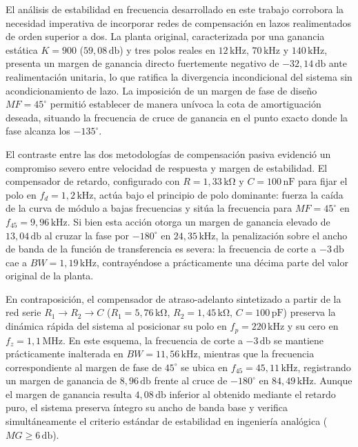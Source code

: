 El análisis de estabilidad en frecuencia desarrollado en este trabajo corrobora la necesidad imperativa de incorporar
redes de compensación en lazos realimentados de orden superior a dos. La planta original, caracterizada
por una ganancia estática $K = 900$ ($59,08\,\si{\decibel}$) y tres polos reales en $12\,\si{\kilo\hertz}$, $70\,\si{\kilo\hertz}$ y
$140\,\si{\kilo\hertz}$, presenta un margen de ganancia directo fuertemente negativo de $-32,14\,\si{\decibel}$ ante realimentación
unitaria, lo que ratifica la divergencia incondicional del sistema sin acondicionamiento de lazo. La imposición de un margen
de fase de diseño $MF = 45^\circ$ permitió establecer de manera unívoca la cota de amortiguación deseada, situando la
frecuencia de cruce de ganancia en el punto exacto donde la fase alcanza los $-135^\circ$.

El contraste entre las dos metodologías de compensación pasiva evidenció un compromiso severo entre velocidad de respuesta y
margen de estabilidad. El compensador de retardo, configurado con $R = 1,33\,\si{\kilo\ohm}$ y $C = 100\,\si{\nano\farad}$ para fijar
el polo en $f_d = 1,2\,\si{\kilo\hertz}$, actúa bajo el principio de polo dominante: fuerza la caída de la curva de módulo a bajas
frecuencias y sitúa la frecuencia para $MF = 45^\circ$ en $f_{45} = 9,96\,\si{\kilo\hertz}$. Si bien esta acción otorga un margen de
ganancia elevado de $13,04\,\si{\decibel}$ al cruzar la fase por $-180^\circ$ en $24,35\,\si{\kilo\hertz}$, la penalización sobre el
ancho de banda de la función de transferencia es severa: la frecuencia de corte a $-3\,\si{\decibel}$ cae a $BW = 1,19\,\si{\kilo\hertz}$,
contrayéndose a prácticamente una décima parte del valor original de la planta.

En contraposición, el compensador de atraso-adelanto sintetizado a partir de la red serie $R_1 \to R_2 \to C$ ($R_1 = 5,76\,\si{\kilo\ohm}$,
$R_2 = 1,45\,\si{\kilo\ohm}$, $C = 100\,\si{\pico\farad}$) preserva la dinámica rápida del sistema al posicionar su polo en
$f_p = 220\,\si{\kilo\hertz}$ y su cero en $f_z = 1,1\,\si{\mega\hertz}$. En este esquema, la frecuencia de corte a $-3\,\si{\decibel}$
se mantiene prácticamente inalterada en $BW = 11,56\,\si{\kilo\hertz}$, mientras que la frecuencia correspondiente al margen de fase
de $45^\circ$ se ubica en $f_{45} = 45,11\,\si{\kilo\hertz}$, registrando un margen de ganancia de $8,96\,\si{\decibel}$ frente al cruce
de $-180^\circ$ en $84,49\,\si{\kilo\hertz}$. Aunque el margen de ganancia resulta $4,08\,\si{\decibel}$ inferior al obtenido mediante
el retardo puro, el sistema preserva íntegro su ancho de banda base y verifica simultáneamente el criterio estándar de estabilidad
en ingeniería analógica ($MG \ge 6\,\si{\decibel}$).


